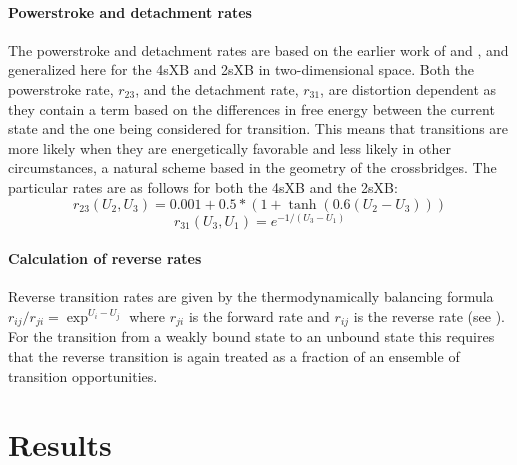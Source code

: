 \documentclass[]{article}
\begin{document}
\paragraph{Powerstroke and detachment rates} %
The powerstroke and detachment rates are based on the earlier work of \citet{Pate:1989:p181} and \citet{Tanner:2007:pe115}, and generalized here for the 4sXB and 2sXB in two-dimensional space. 
Both the powerstroke rate, $r_{23}$, and the detachment rate, $r_{31}$, are distortion dependent as they contain a term based on the differences in free energy between the current state and the one being considered for transition. 
This means that transitions are more likely when they are energetically favorable and less likely in other circumstances, a natural scheme based in the geometry of the crossbridges.
The particular rates are as follows for both the 4sXB and the 2sXB:
$$r_{23}(U_2, U_3) = 0.001 + 0.5 * (1 + \tanh(0.6 (U_2 - U_3))) $$
$$r_{31}(U_3, U_1) = e^{-1 / (U_3 - U_1)}$$

\paragraph{Calculation of reverse rates} %
Reverse transition rates are given by the thermodynamically balancing formula $r_{ij}/r_{ji}=\exp^{U_i-U_j}$ where $r_{ji}$ is the forward rate and $r_{ij}$ is the reverse rate (see \citet{Pate:1989:p181, Daniel:1998:p1611, Tanner:2007:pe115}).
For the transition from a weakly bound state to an unbound state this requires that the reverse transition is again treated as a fraction of an ensemble of transition opportunities.



\section{Results} %

\end{document}
